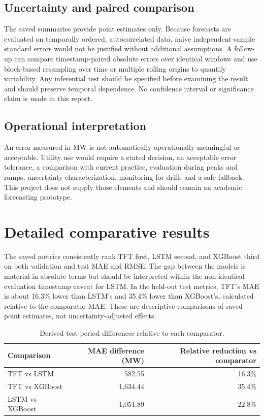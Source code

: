\documentclass[12pt,a4paper]{article}
\begin{document}
\subsection{Uncertainty and paired comparison}
The saved summaries provide point estimates only. Because forecasts are evaluated on temporally ordered, autocorrelated data, naive independent-sample standard errors would not be justified without additional assumptions. A follow-up can compare timestamp-paired absolute errors over identical windows and use block-based resampling over time or multiple rolling origins to quantify variability. Any inferential test should be specified before examining the result and should preserve temporal dependence. No confidence interval or significance claim is made in this report.

\subsection{Operational interpretation}
An error measured in MW is not automatically operationally meaningful or acceptable. Utility use would require a stated decision, an acceptable error tolerance, a comparison with current practice, evaluation during peaks and ramps, uncertainty characterization, monitoring for drift, and a safe fallback. This project does not supply those elements and should remain an academic forecasting prototype.

\newpage
\section{Detailed comparative results}
The saved metrics consistently rank TFT first, LSTM second, and XGBoost third on both validation and test MAE and RMSE. The gap between the models is material in absolute terms but should be interpreted within the non-identical evaluation timestamp caveat for LSTM. In the held-out test metrics, TFT's MAE is about 16.3\% lower than LSTM's and 35.4\% lower than XGBoost's, calculated relative to the comparator MAE. These are descriptive comparisons of saved point estimates, not uncertainty-adjusted effects.

\begin{table}[H]\centering\caption{Derived test-period differences relative to each comparator.}\begin{tabular}{lrr}\toprule Comparison & MAE difference (MW) & Relative reduction vs comparator \\\midrule TFT vs LSTM & 582.55 & 16.3\%\\ TFT vs XGBoost & 1,634.44 & 35.4\%\\ LSTM vs XGBoost & 1,051.89 & 22.8\%\\\bottomrule\end{tabular}\end{table}
\end{document}
